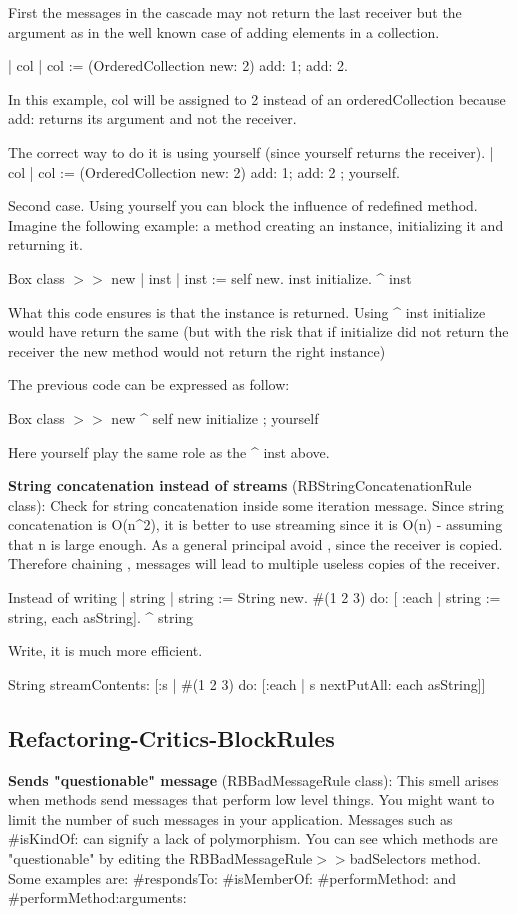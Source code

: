 	First the messages in the cascade may not return the last receiver but the argument as in the well known case of adding elements in a collection.
	
	| col  | 
	col := (OrderedCollection new: 2) add: 1; add: 2.
	
	In this example, col will be assigned to 2 instead of an orderedCollection because add: returns its argument and not the receiver. 
	
	The correct way to do it is using yourself (since yourself returns the receiver).
	| col  | 
	col := (OrderedCollection new: 2) add: 1; add: 2 ; yourself.
	
	
	Second case. Using yourself you can block the influence of redefined method. 
	Imagine the following example: a method creating an instance, initializing it and returning it.
	
	Box class $>>$ new
		| inst | 
		inst := self new.
		inst initialize. 
		^ inst
		
	What this code ensures is that the instance is returned. Using ^ inst initialize would have 
	return the same (but with the risk that if initialize did not return the receiver the new method would not return the right instance)
	
	The previous code can be expressed as follow:
	
	Box class $>>$ new
		^ self new initialize ; yourself 
		
	Here yourself play the same role as the ^ inst above. 
	
	

\textbf{String concatenation instead of streams} (RBStringConcatenationRule class): Check for string concatenation inside some iteration message. Since string concatenation is O(n^2), it is better to use streaming since it is O(n) - assuming that n is large enough. As a general principal avoid , since the receiver is copied. Therefore chaining , messages will lead to multiple useless copies of the receiver. 

Instead of writing
	| string | 
	string := String new.
	\#(1 2 3) do: [ :each |
		string := string, each asString].
	^ string

Write, it is much more efficient.

	String streamContents: [:s | 
		\#(1 2 3)  do: [:each | s nextPutAll: each asString]]

\subsection{Refactoring-Critics-BlockRules}
\textbf{Sends "questionable" message} (RBBadMessageRule class): This smell arises when methods send messages that perform low level things. You might want to limit the number of such messages in your application. Messages such as \#isKindOf: can signify a lack of polymorphism. You can see which methods are "questionable" by editing the RBBadMessageRule$>>$badSelectors method. Some examples are: \#respondsTo: \#isMemberOf: \#performMethod: and \#performMethod:arguments:

